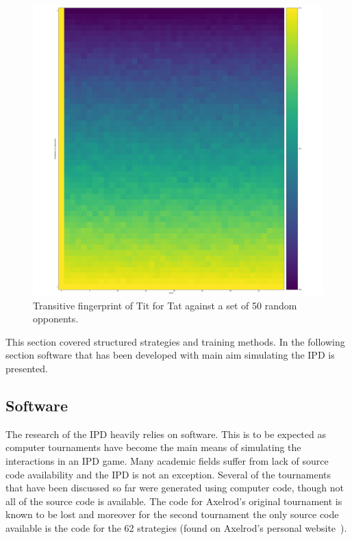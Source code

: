 \documentclass{article}
\theoremstyle{definition}
\begin{document}
\begin{figure}[!hbtp]
    \centering
    \includegraphics[height=.3\textheight]{./assets/images/Tit_for_Tat_fingerprint.png}
    \caption{Transitive fingerprint of Tit for Tat against a set of 50 random opponents.}
    \label{fig:transitive_fingerprinting}
\end{figure}

This section covered structured strategies and training methods. In the following
section software that has been developed with main aim simulating the IPD
is presented.

\subsection{Software}\label{section:software}

The research of the IPD heavily relies on software.
This is to be expected as computer tournaments have become the main
means of simulating the interactions in an IPD game.
Many academic fields suffer from lack of source code availability and the IPD
is not an exception. Several of the tournaments that have been discussed so far were generated
using computer code, though not all of the source code is available.
The code for Axelrod's original tournament is known to be lost and
moreover for the second tournament the only source code available is the code
for the 62 strategies (found on Axelrod's personal website~\cite{fortan_code}).
\end{document}
